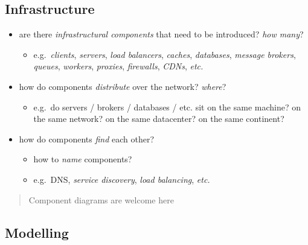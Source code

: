 \documentclass{scrartcl}
\begin{document}
\subsection{Infrastructure}\label{infrastructure}

\begin{itemize}
	\item are there \emph{infrastructural components} that need to be introduced? \emph{how many}?
	\begin{itemize}
		\item e.g.~\emph{clients}, \emph{servers}, \emph{load balancers},
		\emph{caches}, \emph{databases}, \emph{message brokers},
		\emph{queues}, \emph{workers}, \emph{proxies}, \emph{firewalls},
		\emph{CDNs}, \emph{etc.}
	\end{itemize}
	
	\item how do components \emph{distribute} over the network? \emph{where}?
	\begin{itemize}
		\item e.g.~do servers / brokers / databases / etc. sit on the same
		machine? on the same network? on the same datacenter? on the same
		continent?
	\end{itemize}
	
	\item how do components \emph{find} each other?
	\begin{itemize}
		\item how to \emph{name} components?
		\item e.g.~DNS, \emph{service discovery}, \emph{load balancing},
		\emph{etc.}
	\end{itemize}
\end{itemize}

\begin{quote}
	Component diagrams are welcome here
\end{quote}

\subsection{Modelling}\label{modelling}
\end{document}

